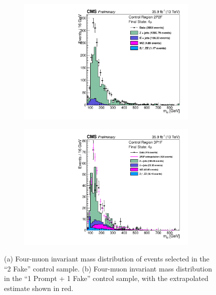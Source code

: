 \begin{figure}[!htb]
\begin{center}
\begin{subfigure}{0.49\textwidth}
\centering
    {\includegraphics [width=0.95\textwidth] {Figures/RedBkg/HZZ_2P2Fuw_ZZMass_4m.pdf}}
\caption{}
\end{subfigure}
\begin{subfigure}{0.49\textwidth}
\centering
    {\includegraphics [width=0.95\textwidth] {Figures/RedBkg/HZZ_3P1Fuw_ZZMass_4m.pdf}}
\caption{}
\end{subfigure}
\caption{
(a) Four-muon invariant mass distribution of events selected in the ``2 Fake'' control sample. (b) Four-muon invariant mass distribution in the ``1 Prompt + 1 Fake'' control sample, with the extrapolated estimate shown in red.
}
\label{fig:FF}
\end{center}
\end{figure}


